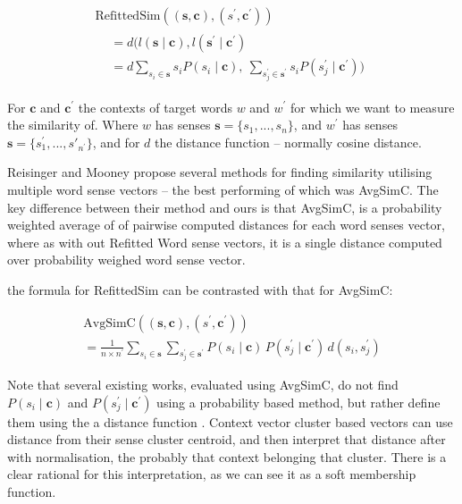 \documentclass{sig-alternate}
\renewcommand{\c}{\mathbf{c}}
\newcommand{\s}{\mathbf{s}}
\begin{document}
\begin{multline} \label{eq:refittedsim}
\mathrm{RefittedSim}((\s,\c),(s^{\prime},\c^{\prime}))\\
\begin{aligned}
&= d(l(\s \mid \c), l(\s^\prime \mid \c^\prime)\\
&= d
\sum_{s_{i}\in\s}s_{i}P(s_{i}\mid\c),\:
\sum_{s_{j}^{\prime}\in\s^{\prime}}s_{i}P(s_{j}^{\prime}\mid\c^{\prime}))
\end{aligned}
\end{multline}

For $\c$ and $\c^\prime$ the contexts of target words $w$ and $w^\prime$ for which we want to measure the similarity of. Where $w$ has senses $\s=\{s_1,...,s_n\}$, and $w^\prime$ has senses $\s=\{s^\prime_1,...,s\prime_{n^\prime}\}$, and for $d$ the distance function -- normally cosine distance.

Reisinger and Mooney \parencite{Reisinger2010} propose several methods for finding similarity utilising multiple word sense vectors -- the best performing of which was AvgSimC.
The key difference between their method and ours is that AvgSimC, is a probability weighted average of of pairwise computed distances for each word senses vector,
where as with out Refitted Word sense vectors, it is a single distance computed over probability weighed word sense vector.

the formula for RefittedSim  can be contrasted with that for AvgSimC:


\begin{multline}
\mathrm{AvgSimC}((\s,\c),(s^{\prime},\c^{\prime})) \\
=  \frac{1}{n \times n^{\prime}}
\sum_{s_{i}\in\s}
\sum_{s_{j}^{\prime}\in\s^{\prime}}
P(s_{i}\mid\c)\,P(s_{j}^{\prime}\mid\c^{\prime})\,d(s_{i},s_{j}^{\prime})
\end{multline}


Note that several existing works, evaluated using AvgSimC, do not find $P(s_{i}\mid\c)$ and $P(s_{j}^{\prime}\mid\c^\prime)$ using a probability based method, but rather define them using the a distance function \parencite{Reisinger2010, Huang2012}. Context vector cluster based vectors can use distance from their sense cluster centroid, and then interpret that distance after with normalisation, the probably that context belonging that cluster. There is a clear rational for this interpretation, as we can see it as a soft membership function. 
\end{document}
